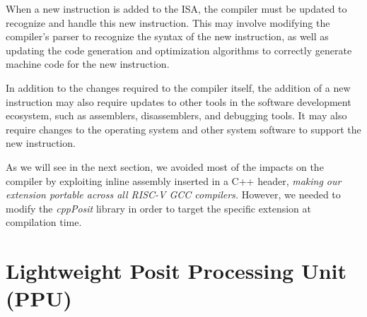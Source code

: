 When a new instruction is added to the ISA, the compiler must be updated to recognize and handle this new instruction. This may involve modifying the compiler's parser to recognize the syntax of the new instruction, as well as updating the code generation and optimization algorithms to correctly generate machine code for the new instruction.

In addition to the changes required to the compiler itself, the addition of a new instruction may also require updates to other tools in the software development ecosystem, such as assemblers, disassemblers, and debugging tools. It may also require changes to the operating system and other system software to support the new instruction.

As we will see in the next section, we avoided most of the impacts on the compiler by exploiting inline assembly inserted in a C++ header, \textit{making our extension portable across all RISC-V GCC compilers.} However, we needed to modify the \textit{cppPosit} library in order to target the specific extension at compilation time.

\section{Lightweight Posit Processing Unit (PPU)}

